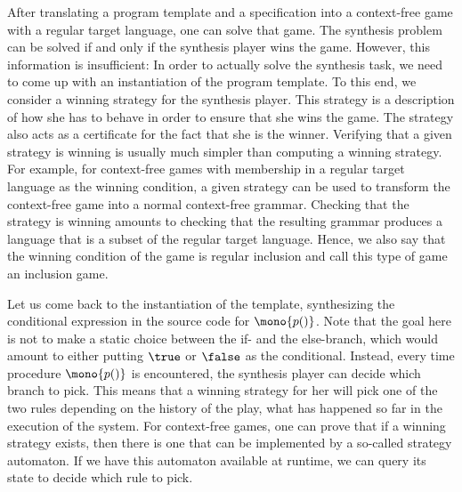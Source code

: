 \documentclass[../../diss.tex]{subfiles}
\begin{document}
After translating a program template and a specification into a context-free game with a regular target language, one can solve that game.
The synthesis problem can be solved if and only if the synthesis player wins the game.
However, this information is insufficient:
In order to actually solve the synthesis task, we need to come up with an instantiation of the program template.
To this end, we consider a winning strategy for the synthesis player.
This strategy is a description of how she has to behave in order to ensure that she wins the game.
The strategy also acts as a certificate for the fact that she is the winner.
Verifying that a given strategy is winning is usually much simpler than computing a winning strategy.
For example, for context-free games with membership in a regular target language as the winning condition, a given strategy can be used to transform the context-free game into a normal context-free grammar.
Checking that the strategy is winning amounts to checking that the resulting grammar produces a language that is a subset of the regular target language.
Hence, we also say that the winning condition of the game is regular inclusion and call this type of game an inclusion game.

Let us come back to the instantiation of the template, \ie synthesizing the conditional expression in the source code for $\mono{p()}$.
Note that the goal here is not to make a static choice between the if- and the else-branch, which would amount to either putting $\true$ or $\false$ as the conditional.
Instead, every time procedure $\mono{p()}$ is encountered, the synthesis player can decide which branch to pick.
This means that a winning strategy for her will pick one of the two rules depending on the history of the play, \ie what has happened so far in the execution of the system.
For context-free games, one can prove that if a winning strategy exists, then there is one that can be implemented by a so-called strategy automaton.
If we have this automaton available at runtime, we can query its state to decide which rule to pick.
\end{document}
